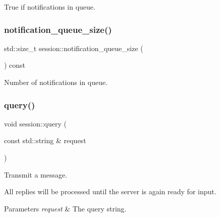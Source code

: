 True if notifications in queue. 

\mbox{\label{classsession_a3faec32b930e7b8e240d69a9e967fbd7}} 
\subsubsection{\texorpdfstring{notification\+\_\+queue\+\_\+size()}{notification\_queue\_size()}}
{\footnotesize\ttfamily std\+::size\+\_\+t session\+::notification\+\_\+queue\+\_\+size (\begin{DoxyParamCaption}{ }\end{DoxyParamCaption}) const\hspace{0.3cm}{\ttfamily [inline]}}



Number of notifications in queue. 

\mbox{\label{classsession_a30a6b529e3bd3de3d2ffdc12c162db06}} 
\subsubsection{\texorpdfstring{query()}{query()}}
{\footnotesize\ttfamily void session\+::query (\begin{DoxyParamCaption}\item[{const std\+::string \&}]{request }\end{DoxyParamCaption})\hspace{0.3cm}{\ttfamily [inline]}}



Transmit a message. 

All replies will be processed until the server is again ready for input.


\begin{DoxyParams}{Parameters}
{\em request} & The query string. \\
\hline
\end{DoxyParams}
\mbox{\label{classsession_a02fc3cd2b93c9ef779d17060bb2f08a0}} 
